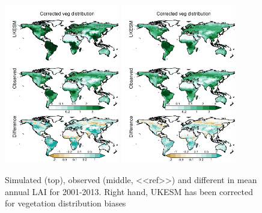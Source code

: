 \documentclass[bg, manuscript]{copernicus}
\begin{document}
\begin{figure}[t]
        \includegraphics[width=5cm]{figs/LAI/fire_var_seasonality-maps-AA-mapscontrol-lai.png}
        \includegraphics[width=5cm]{figs/LAI/fire_var_seasonality-maps-AA-mapsobsVegDist-lai.png}
    
    \caption{Simulated (top), observed (middle, <<ref>>) and different in mean annual LAI for 2001-2013. Right hand, UKESM has been corrected for vegetation distribution biases \label{fig:LAImap}}
\end{figure}
\end{document}
